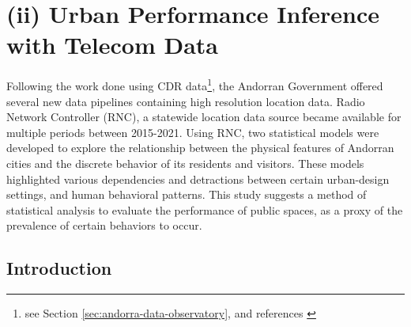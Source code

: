 \section{(ii) Urban Performance Inference with Telecom Data}

 {
  Following the work done using CDR data\footnote{see Section \eqref{sec:andorra-data-observatory}, and references \cite{leng2016analysis, grignard2017agent}}, the Andorran Government offered several new data pipelines containing high resolution location data. Radio Network Controller (RNC), a statewide location data source became available for multiple periods between 2015-2021. Using RNC, two statistical models were developed to explore the relationship between the physical features of Andorran cities and the discrete behavior of its residents and visitors. These models highlighted various dependencies and detractions between certain urban-design settings, and human behavioral patterns. This study suggests a method of statistical analysis to evaluate the performance of public spaces, as a proxy of the prevalence of certain behaviors to occur.
 }

\subsection{Introduction}

